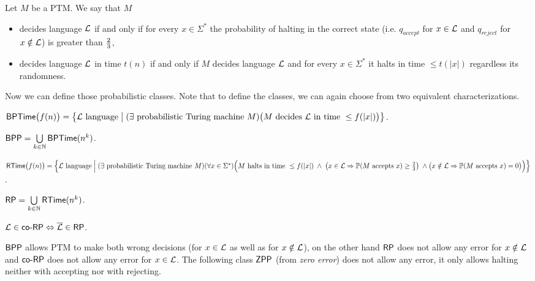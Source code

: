 		Let $M$ be a PTM. We say that $M$
		\begin{itemize}
			\item decides language $\cal L$ if and only if for every $x\in\Sigma^*$ the probability of halting in the correct state (i.e. $q_{accept}$ for $x\in{\cal L}$ and $q_{reject}$ for $x\notin{\cal L}$) is greater than $\nicefrac{2}{3}$,
			\item decides language $\cal L$ in time $t(n)$ if and only if $M$ decides language $\cal L$ and for every $x\in\Sigma^*$ it halts in time $\leq t(|x|)$ regardless its randomness.
		\end{itemize}
		Now we can define those probabilistic classes. Note that to define the classes, we can again choose from two equivalent characterizations.
		
		
		\begin{defn}\label{def:BPTime}
			$\mathsf{BPTime}\bigl(f(n)\bigr) = \bigl\{ {\cal L}\textnormal{ language} \bigm| (\exists \textnormal{ probabilistic Turing machine }M)\\ \bigl(M\textnormal{ decides }{\cal L}\textnormal{ in time }\leq f(|x|)\bigr) \bigr\}$.
		\end{defn}
		
		\begin{defn}
			$\mathsf{BPP} = \bigcup\limits_{k\in\mathbb{N}} \mathsf{BPTime}(n^k)$.
		\end{defn}
		
		\begin{defn}
			$\RTime\bigl(f(n)\bigr) = \Bigl\{ {\cal L}\textnormal{ language} \Bigm| (\exists \textnormal{ probabilistic Turing machine }M)\\ (\forall x\in\Sigma^*)\Bigl(M \textnormal{ halts in time } \leq f(|x|) \;\wedge\; \bigl( x\in{\cal L} \then \prob(M\textnormal{ accepts }x) \geq \nicefrac{2}{3} \bigr) \;\wedge\\ \bigl( x\notin{\cal L} \then \prob(M\textnormal{ accepts }x) = 0 \bigr) \Bigr) \Bigr\}$.
		\end{defn}
		
		\begin{defn}
			$\mathsf{RP} = \bigcup\limits_{k\in\mathbb{N}} \mathsf{RTime}(n^k)$.
		\end{defn}
		
		\begin{defn}
			$ {\cal L} \in \mathsf{co}\textnormal{-}\mathsf{RP} \Leftrightarrow {\cal\overline L} \in \mathsf{RP} $.
		\end{defn}
		
		\begin{remark}
			$\mathsf{BPP}$ allows PTM to make both wrong decisions (for $x\in\cal L$ as well as for $x\notin\cal L$), on the other hand $\mathsf{RP}$ does not allow any error for $x\notin\cal L$ and $\mathsf{co}\textnormal{-}\mathsf{RP}$ does not allow any error for $x\in\cal L$. The following class $\mathsf{ZPP}$ (from {\em zero error}) does not allow any error, it only allows halting neither with accepting nor with rejecting.
		\end{remark}
		
